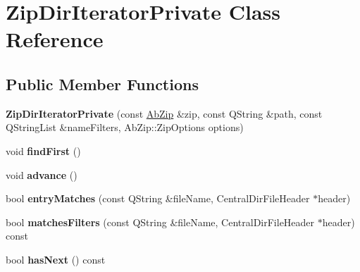 \hypertarget{class_zip_dir_iterator_private}{}\section{Zip\+Dir\+Iterator\+Private Class Reference}
\label{class_zip_dir_iterator_private}
\subsection*{Public Member Functions}
\begin{DoxyCompactItemize}
\item 
{\bfseries Zip\+Dir\+Iterator\+Private} (const \hyperlink{class_ab_zip}{Ab\+Zip} \&zip, const Q\+String \&path, const Q\+String\+List \&name\+Filters, Ab\+Zip\+::\+Zip\+Options options)\hypertarget{class_zip_dir_iterator_private_a1fb975c6a6e571c2b8e38dcde21eff2c}{}\label{class_zip_dir_iterator_private_a1fb975c6a6e571c2b8e38dcde21eff2c}

\item 
void {\bfseries find\+First} ()\hypertarget{class_zip_dir_iterator_private_a067b9f1e9ab006e9d6747b09c058bba9}{}\label{class_zip_dir_iterator_private_a067b9f1e9ab006e9d6747b09c058bba9}

\item 
void {\bfseries advance} ()\hypertarget{class_zip_dir_iterator_private_a1bcb9dbfcec848628e812f0c19e4ae36}{}\label{class_zip_dir_iterator_private_a1bcb9dbfcec848628e812f0c19e4ae36}

\item 
bool {\bfseries entry\+Matches} (const Q\+String \&file\+Name, Central\+Dir\+File\+Header $\ast$header)\hypertarget{class_zip_dir_iterator_private_a925f1a307a6d598fd7d3b1036902aec8}{}\label{class_zip_dir_iterator_private_a925f1a307a6d598fd7d3b1036902aec8}

\item 
bool {\bfseries matches\+Filters} (const Q\+String \&file\+Name, Central\+Dir\+File\+Header $\ast$header) const \hypertarget{class_zip_dir_iterator_private_a6e754b0a7567136f7c54b46aa8d9e5bd}{}\label{class_zip_dir_iterator_private_a6e754b0a7567136f7c54b46aa8d9e5bd}

\item 
bool {\bfseries has\+Next} () const \hypertarget{class_zip_dir_iterator_private_ab2d44c3c54fa1714ba675697411bd37e}{}\label{class_zip_dir_iterator_private_ab2d44c3c54fa1714ba675697411bd37e}

\end{DoxyCompactItemize}
